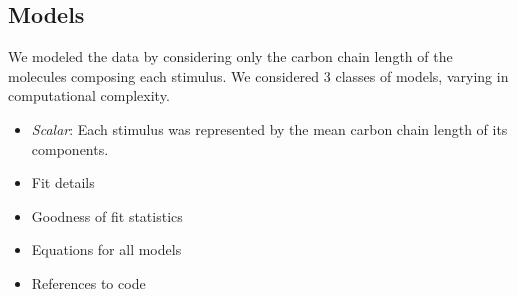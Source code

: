\subsection*{Models}
\label{sec:methods_models}

We modeled the data by considering only the carbon chain length of the molecules composing each stimulus.  
We considered 3 classes of models, varying in computational complexity.  
\begin{itemize}
\item \textit{Scalar}: Each stimulus was represented by the mean carbon chain length of its components.    


\item Fit details
\item Goodness of fit statistics
\item Equations for all models
\item References to code
\end{itemize}
